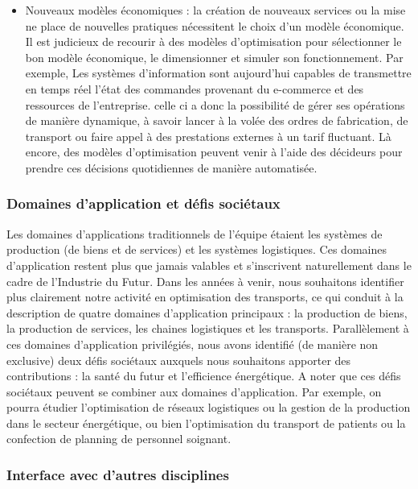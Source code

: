 \begin{itemize}
	\item Nouveaux modèles économiques : la création de nouveaux services ou la mise ne place de nouvelles pratiques nécessitent le choix d'un modèle économique. Il est judicieux de recourir à des modèles d'optimisation pour sélectionner le bon modèle économique, le dimensionner et simuler son fonctionnement. Par exemple, 
	Les systèmes d'information sont aujourd'hui capables de transmettre en temps réel l'état des commandes provenant du e-commerce et des ressources de l'entreprise. celle ci a donc la possibilité de gérer ses opérations de manière dynamique, à savoir lancer à la volée des ordres de fabrication, de transport ou faire appel à des prestations externes à un tarif fluctuant. Là encore, des modèles d'optimisation peuvent venir à l'aide des décideurs pour prendre ces décisions quotidiennes de manière automatisée. 
	

		\end{itemize}

	
		\subsubsection{Domaines d'application et défis sociétaux} 
	
	Les domaines d'applications traditionnels de l'équipe étaient les systèmes de production (de biens et de services) et les systèmes logistiques. 
	Ces domaines d'application restent plus que jamais valables et s'inscrivent naturellement dans le cadre de l'Industrie du Futur. 
	Dans les années à venir, nous souhaitons identifier plus clairement notre activité en optimisation des transports, ce qui conduit à la description de quatre domaines d'application principaux : la production de biens, la production de services, les chaines logistiques et les transports. Parallèlement à ces domaines d'application privilégiés, nous avons identifié (de manière non exclusive) deux défis sociétaux auxquels nous souhaitons apporter des contributions : la santé du futur et l'efficience énergétique. A noter que ces défis sociétaux peuvent se combiner aux domaines d'application. Par exemple, on pourra étudier l'optimisation de réseaux logistiques ou la gestion de la production dans le secteur énergétique, ou bien l'optimisation du transport de patients ou la confection de planning de personnel soignant. 
	
	
	\subsubsection{Interface avec d'autres disciplines}
	
